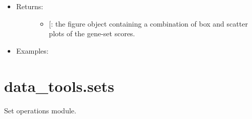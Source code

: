 \documentclass[letterpaper,10pt,english]{sphinxmanual}
\begin{document}
\begin{fulllineitems}
\begin{itemize}
\begin{description}
\begin{itemize}
\end{itemize}

\end{description}

\item {} \begin{description}
\item[{Returns:}] \leavevmode\begin{itemize}
\item {} 
{[}\sphinxstyleemphasis{matplotlib.figure.Figure}{]}: the figure object containing a
combination of box and scatter plots of the gene-set scores.

\end{itemize}

\end{description}

\item {} \begin{description}
\item[{Examples:}] \leavevmode
{}%
\begin{sphinxVerbatim}[commandchars=\\\{\}]
 \PYG{p}{[} \PYG{p}{]}
\end{sphinxVerbatim}

\noindent{}

\end{description}

\end{itemize}

\end{fulllineitems}

\label{\detokenize{sets:module-data_tools.sets}}

\section{data\_tools.sets}
\label{\detokenize{sets:data-tools-sets}}\label{\detokenize{sets::doc}}
Set operations module.
\end{document}
